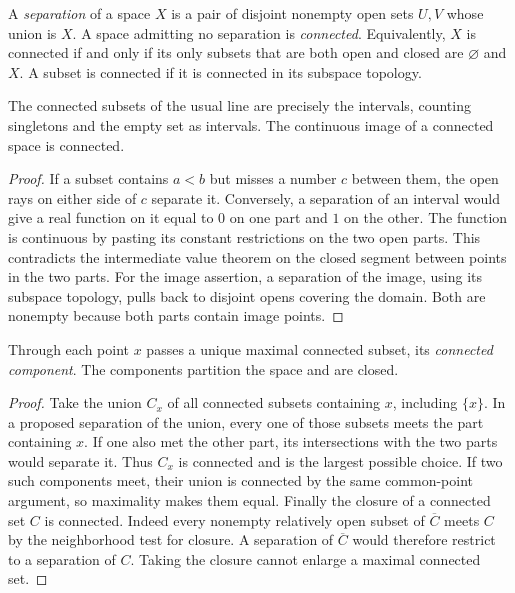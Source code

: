 \begin{definition}\label{f:q-connected}
A \emph{separation} of a space $X$ is a pair of disjoint nonempty open sets $U,V$ whose union is $X$. A space admitting no separation is \emph{connected}. Equivalently, $X$ is connected if and only if its only subsets that are both open and closed are $\varnothing$ and $X$. A subset is connected if it is connected in its subspace topology.
\end{definition}

\begin{proposition}\label{f:q-connected-image}
The connected subsets of the usual line are precisely the intervals, counting singletons and the empty set as intervals. The continuous image of a connected space is connected.
\end{proposition}
\begin{proof}
If a subset contains $a<b$ but misses a number $c$ between them, the open rays on either side of $c$ separate it. Conversely, a separation of an interval would give a real function on it equal to $0$ on one part and $1$ on the other. The function is continuous by pasting its constant restrictions on the two open parts. This contradicts the intermediate value theorem on the closed segment between points in the two parts. For the image assertion, a separation of the image, using its subspace topology, pulls back to disjoint opens covering the domain. Both are nonempty because both parts contain image points.
\end{proof}

\begin{proposition}\label{f:q-components}
Through each point $x$ passes a unique maximal connected subset, its \emph{connected component}. The components partition the space and are closed.
\end{proposition}
\begin{proof}
Take the union $C_x$ of all connected subsets containing $x$, including $\{x\}$. In a proposed separation of the union, every one of those subsets meets the part containing $x$. If one also met the other part, its intersections with the two parts would separate it. Thus $C_x$ is connected and is the largest possible choice. If two such components meet, their union is connected by the same common-point argument, so maximality makes them equal. Finally the closure of a connected set $C$ is connected. Indeed every nonempty relatively open subset of $\overline C$ meets $C$ by the neighborhood test for closure. A separation of $\overline C$ would therefore restrict to a separation of $C$. Taking the closure cannot enlarge a maximal connected set.
\end{proof}

